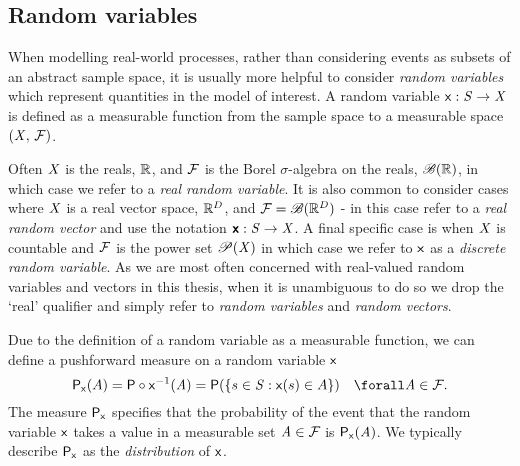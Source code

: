 \subsection{Random variables}\label{subsec:random-variables}

When modelling real-world processes, rather than considering events as subsets of an abstract sample space, it is usually more helpful to consider \emph{random variables} which represent quantities in the model of interest. A random variable $\mathsf{x} : \mathit{S} \to \mathit{X}$ is defined as a measurable function from the sample space to a measurable space $(\mathit{X},\,\mathcal{F})$. 

Often $\mathit{X}$ is the reals, $\mathbb{R}$, and $\mathcal{F}$ is the Borel $\sigma$-algebra on the reals, $\mathscr{B}(\mathbb{R})$, in which case we refer to a \emph{real random variable}. It is also common to consider cases where $\mathit{X}$ is a real vector space, $\mathbb{R}^D$, and $\mathcal{F} = \mathscr{B}(\mathbb{R}^D)$ - in this case refer to a \emph{real random vector} and use the notation $\boldsymbol{\mathsf{x}} : \mathit{S} \to \mathit{X}$. A final specific case is when $\mathit{X}$ is countable and $\mathcal{F}$ is the power set $\mathscr{P}(\mathit{X})$ in which case we refer to $\mathsf{x}$ as a \emph{discrete random variable}. As we are most often concerned with real-valued random variables and vectors in this thesis, when it is unambiguous to do so we drop the `real' qualifier and simply refer to \emph{random variables} and \emph{random vectors}.

Due to the definition of a random variable as a measurable function, we can define a pushforward measure on a random variable $\mathsf{x}$
\begin{equation}
  \prob{\rvar{x}}(A) 
  = \probability\circ\rvar{x}^{-1}(\set{A})
  = \probability\lpa \lbr s \in \set{S}: \rvar{x}(s) \in A \rbr \rpa
  \quad \forall \set{A} \in \sset{F}.
\end{equation}
The measure $\mathsf{P}_{\mathsf{x}}$ specifies that the probability of the event that the random variable $\mathsf{x}$ takes a value in a measurable set $\mathit{A} \in \mathcal{F}$ is $\mathsf{P}_{\mathsf{x}}(\mathit{A})$. We typically describe $\mathsf{P}_{\mathsf{x}}$ as the \emph{distribution} of $\mathsf{x}$.

